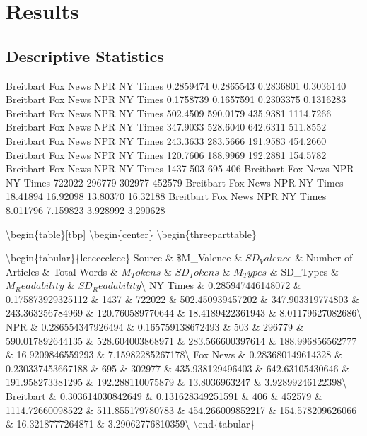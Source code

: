 \documentclass[english,,man]{apa6}
\begin{document}
\hypertarget{results}{%
\section{Results}\label{results}}

\hypertarget{descriptive-statistics}{%
\subsection{Descriptive Statistics}\label{descriptive-statistics}}

Breitbart Fox News NPR NY Times
0.2859474 0.2865543 0.2836801 0.3036140
Breitbart Fox News NPR NY Times
0.1758739 0.1657591 0.2303375 0.1316283
Breitbart Fox News NPR NY Times
502.4509 590.0179 435.9381 1114.7266
Breitbart Fox News NPR NY Times
347.9033 528.6040 642.6311 511.8552
Breitbart Fox News NPR NY Times
243.3633 283.5666 191.9583 454.2660
Breitbart Fox News NPR NY Times
120.7606 188.9969 192.2881 154.5782
Breitbart Fox News NPR NY Times
1437 503 695 406
Breitbart Fox News NPR NY Times
722022 296779 302977 452579
Breitbart Fox News NPR NY Times
18.41894 16.92098 13.80370 16.32188
Breitbart Fox News NPR NY Times
8.011796 7.159823 3.928992 3.290628

\textbackslash{}begin\{table\}{[}tbp{]}
\textbackslash{}begin\{center\}
\textbackslash{}begin\{threeparttable\}

\caption{\label{tab:exp1_source_descriptives}}

\textbackslash{}begin\{tabular\}\{lcccccclccc\}
\toprule
Source \& \$M\_Valence \& \(SD_Valence\) \& Number of Articles \& Total Words \& \(M_Tokens\) \& \(SD_Tokens\) \& \(M_Types\) \& SD\_Types \& \(M_Readability\) \& \(SD_Readability\)\textbackslash{}
\midrule
NY Times \& 0.285947446148072 \& 0.175873929325112 \& 1437 \& 722022 \& 502.450939457202 \& 347.903319774803 \& 243.363256784969 \& 120.760589770644 \& 18.4189422361943 \& 8.01179627082686\textbackslash{}
NPR \& 0.286554347926494 \& 0.165759138672493 \& 503 \& 296779 \& 590.017892644135 \& 528.604003868971 \& 283.566600397614 \& 188.996856562777 \& 16.9209846559293 \& 7.15982285267178\textbackslash{}
Fox News \& 0.283680149614328 \& 0.230337453667188 \& 695 \& 302977 \& 435.938129496403 \& 642.63105430646 \& 191.958273381295 \& 192.288110075879 \& 13.8036963247 \& 3.92899246122398\textbackslash{}
Breitbart \& 0.303614030842649 \& 0.131628349251591 \& 406 \& 452579 \& 1114.72660098522 \& 511.855179780783 \& 454.266009852217 \& 154.578209626066 \& 16.3218777264871 \& 3.29062776810359\textbackslash{}
\bottomrule
\addlinespace
\textbackslash{}end\{tabular\}
\end{document}
